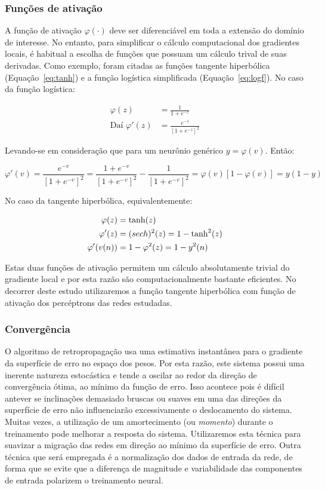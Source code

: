 \subsubsection{Funções de ativação} 

A função de ativação $\varphi(\cdot)$ deve ser diferenciável em toda a
extensão do domínio de interesse. No entanto, para simplificar o cálculo
computacional dos gradientes locais, é habitual a escolha de funções que
possuam um cálculo trival de suas derivadas. Como exemplo, foram citadas as
funções tangente hiperbólica (Equação~\ref{eq:tanh}) e a função logística
simplificada (Equação~\ref{eq:logf}). No caso da função logística:

\begin{align}
\varphi(z) &= \frac{1}{1 + e^{-z}} \\
\text{Daí } \varphi'(z) &= \frac{e^{-z}}{[1+e^{-z}]^2}
\end{align}

Levando-se em consideração que para um neurônio genérico $y =
\varphi(v)$. Então:

\begin{equation}
\varphi'(v) = \frac{e^{-v}}{[1+e^{-v}]^2} = \frac{1+e^{-v}}{[1+e^{-v}]^2} -
\frac{1}{[1+e^{-v}]^2} = \varphi(v)[1 - \varphi(v)] = y(1-y)
\end{equation}

No caso da tangente hiperbólica, equivalentemente:

\begin{align}
\varphi(z) &= \tanh(z) \\
\varphi'(z) &= \text(sech)^2(z) = 1 - \tanh^2(z) \\
\varphi'(v(n)) &= 1 - \varphi^2(z) = 1-y^2(n)
\end{align}

Estas duas funções de ativação permitem um cálculo absolutamente trivial do
gradiente local e por esta razão são computacionalmente bastante
eficientes. No decorrer deste estudo utilizaremos a função tangente
hiperbólica com função de ativação dos percéptrons das redes estudadas.

\subsubsection{Convergência}

O algoritmo de retropropagação usa uma estimativa instantânea para o gradiente
da superfície de erro no espaço dos pesos. Por esta razão, este sistema possui
uma inerente natureza estocástica e tende a oscilar ao redor da direção de
convergência ótima, ao mínimo da função de erro. Isso acontece pois é difícil
antever se inclinações demasiado bruscas ou suaves em uma das direções da
superfície de erro não influenciarão excessivamente o deslocamento do
sistema. Muitas vezes, a utilização de um amortecimento (ou \emph{momento})
durante o treinamento pode melhorar a resposta do sistema. Utilizaremos esta
técnica para suavizar a migração das redes em direção ao mínimo da superfície
de erro. Outra técnica que será empregada é a normalização dos dados de
entrada da rede, de forma que se evite que a diferença de magnitude e
variabilidade das componentes de entrada polarizem o treinamento neural.

